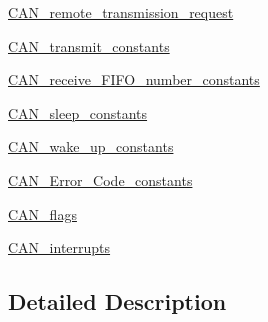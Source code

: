 \begin{DoxyCompactItemize}
\hyperlink{group___c_a_n__remote__transmission__request}{C\-A\-N\-\_\-remote\-\_\-transmission\-\_\-request}
\item 
\hyperlink{group___c_a_n__transmit__constants}{C\-A\-N\-\_\-transmit\-\_\-constants}
\item 
\hyperlink{group___c_a_n__receive___f_i_f_o__number__constants}{C\-A\-N\-\_\-receive\-\_\-\-F\-I\-F\-O\-\_\-number\-\_\-constants}
\item 
\hyperlink{group___c_a_n__sleep__constants}{C\-A\-N\-\_\-sleep\-\_\-constants}
\item 
\hyperlink{group___c_a_n__wake__up__constants}{C\-A\-N\-\_\-wake\-\_\-up\-\_\-constants}
\item 
\hyperlink{group___c_a_n___error___code__constants}{C\-A\-N\-\_\-\-Error\-\_\-\-Code\-\_\-constants}
\item 
\hyperlink{group___c_a_n__flags}{C\-A\-N\-\_\-flags}
\item 
\hyperlink{group___c_a_n__interrupts}{C\-A\-N\-\_\-interrupts}
\end{DoxyCompactItemize}


\subsection{Detailed Description}
